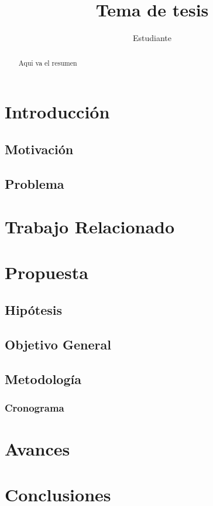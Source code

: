 \documentclass[]{report}
\title{Tema de tesis}
\author{Estudiante}
\begin{document}
	

	

\newpage\null\thispagestyle{empty}\newpage
	

\begin{abstract}
	Aqui va el resumen 
\end{abstract}

\tableofcontents

\chapter{Introducción}
\section{Motivación}
\section{Problema}

\chapter{Trabajo Relacionado}

\chapter{Propuesta}

\section{Hipótesis}
\section{Objetivo General}
\section{Metodología}
\subsection{Cronograma}

\chapter{Avances}

\chapter{Conclusiones}
\end{document}

